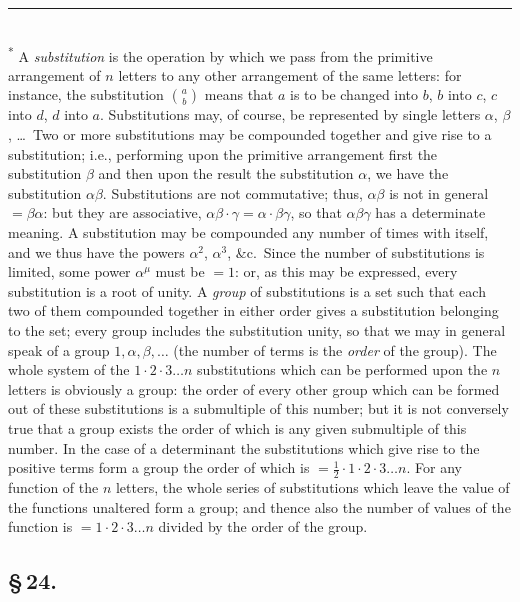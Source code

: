 \documentclass[11pt,a4paper]{book}
\begin{document}
\smallskip
\small\noindent\rule{0.4\textwidth}{0.4pt}\\
\textsuperscript{*} A \textit{substitution} is the operation by which we pass from the primitive arrangement of $n$ letters to any other arrangement of the same letters: for instance, the substitution $\binom{a}{b}$ means that $a$ is to be changed into $b$, $b$ into $c$, $c$ into $d$, $d$ into $a$. Substitutions may, of course, be represented by single letters $\alpha$, $\beta$, \ldots\ Two or more substitutions may be compounded together and give rise to a substitution; i.e., performing upon the primitive arrangement first the substitution $\beta$ and then upon the result the substitution $\alpha$, we have the substitution $\alpha\beta$. Substitutions are not commutative; thus, $\alpha\beta$ is not in general $= \beta\alpha$: but they are associative, $\alpha\beta \cdot \gamma = \alpha \cdot \beta\gamma$, so that $\alpha\beta\gamma$ has a determinate meaning. A substitution may be compounded any number of times with itself, and we thus have the powers $\alpha^{2}$, $\alpha^{3}$, \&c.\ Since the number of substitutions is limited, some power $\alpha^{\mu}$ must be $=1$: or, as this may be expressed, every substitution is a root of unity. A \textit{group} of substitutions is a set such that each two of them compounded together in either order gives a substitution belonging to the set; every group includes the substitution unity, so that we may in general speak of a group $1, \alpha, \beta, \ldots$ (the number of terms is the \textit{order} of the group). The whole system of the $1 \cdot 2 \cdot 3 \ldots n$ substitutions which can be performed upon the $n$ letters is obviously a group: the order of every other group which can be formed out of these substitutions is a submultiple of this number; but it is not conversely true that a group exists the order of which is any given submultiple of this number. In the case of a determinant the substitutions which give rise to the positive terms form a group the order of which is $= \frac{1}{2} \cdot 1 \cdot 2 \cdot 3 \ldots n$. For any function of the $n$ letters, the whole series of substitutions which leave the value of the functions unaltered form a group; and thence also the number of values of the function is $= 1 \cdot 2 \cdot 3 \ldots n$ divided by the order of the group.
\normalsize

\subsection*{\S\,24.}
\end{document}
